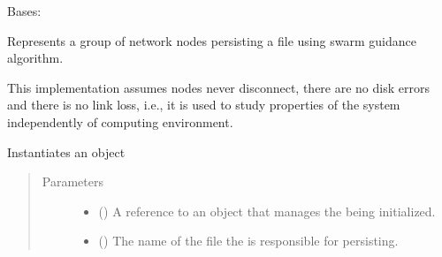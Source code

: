 \documentclass[letterpaper,10pt,english]{sphinxmanual}
\begin{document}
\begin{fulllineitems}
\label{\detokenize{app.domain:app.domain.cluster_groups.SGClusterPerfect}}
Bases: {\hyperref[\detokenize{app.domain:app.domain.cluster_groups.SGCluster}]{}}

Represents a group of network nodes persisting a file using swarm
guidance algorithm.

This implementation assumes nodes never disconnect, there are no disk
errors and there is no link loss, i.e., it is used to study properties of
the system independently of computing environment.

\begin{fulllineitems}
\label{\detokenize{app.domain:app.domain.cluster_groups.SGClusterPerfect.__init__}}
Instantiates an  object
\begin{quote}\begin{description}
\item[{Parameters}] \leavevmode\begin{itemize}
\item {} 
 ({\hyperref[\detokenize{app:app.type_hints.MasterType}]{}}) \textendash{} A reference to an {\hyperref[\detokenize{app.domain:app.domain.master_servers.Master}]{}}
object that manages the  being initialized.

\item {} 
 () \textendash{} The name of the file the  is responsible for
persisting.


\end{itemize}
\end{description}
\end{quote}
\end{fulllineitems}
\end{fulllineitems}
\end{document}
